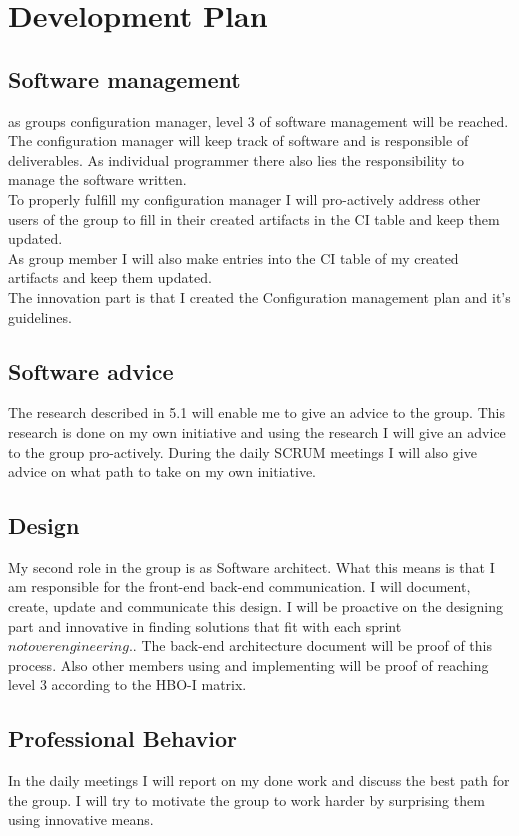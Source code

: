 \newpage
\section{Development Plan}
\label{sec:development}

\subsection{Software management}
as groups configuration manager, level 3 of software management will be reached. The configuration manager will keep track of software and is responsible of deliverables. As individual programmer there also lies the responsibility to manage the software written.\\  
To properly fulfill my configuration manager I will pro-actively address other users of the group to fill in their created artifacts in the CI table and keep them updated.  \\
As group member I will also make entries into the CI table of my created artifacts and keep them updated. \\
The innovation part is that I created the Configuration management plan and it's guidelines.


\subsection{Software advice}
The research described in 5.1 will enable me to give an advice to the group. This research is done on my own initiative and using the research I will give an advice to the group pro-actively. During the daily SCRUM meetings I will also give advice on what path to take on my own initiative.

\subsection{Design}
My second role in the group is as Software architect. What this means is that I am responsible for the front-end back-end communication. I will document, create, update and communicate this design.
I will be proactive on the designing part and innovative in finding solutions that fit with each sprint \(not overengineering.\). The back-end architecture document will be proof of this process. Also other members using and implementing will be proof of reaching level 3 according to the HBO-I matrix.

\subsection{Professional Behavior}
In the daily meetings I will report on my done work and discuss the best path for the group. I will try to motivate the group to work harder by surprising them using innovative means.


